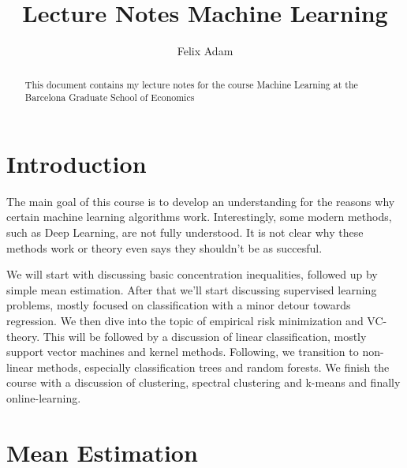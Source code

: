\documentclass[12pt, authoryear]{elsarticle}
\begin{document}
\begin{frontmatter}  %

\title{Lecture Notes Machine Learning}

\author[Add1]{Felix Adam}

\address[Add1]{Barcelona Graduate School of Economics, Barcelona, Spain}


\begin{abstract}
\small{
This document contains my lecture notes for the course Machine Learning at the Barcelona Graduate School of Economics 
}
\end{abstract}

\vspace{1cm}


\vspace{0.5cm}
\end{frontmatter}

\headsep 35pt %

\section{Introduction} \label{introduction}
The main goal of this course is to develop an understanding for the reasons why certain machine learning algorithms work. Interestingly, some modern methods, such as Deep Learning, are not fully understood. It is not clear why these methods work or theory even says they shouldn't be as succesful. 


We will start with discussing basic concentration inequalities, followed up by simple mean estimation. After that we'll start discussing supervised learning problems, mostly focused on classification with a minor detour towards regression. We then dive into the topic of empirical risk minimization and VC-theory. This will be followed by a discussion of linear classification, mostly support vector machines and kernel methods. Following, we transition to non-linear methods, especially classification trees and random forests. We finish the course with a discussion of clustering, spectral clustering and k-means and finally online-learning. 

\section{Mean Estimation} \label{mean_estimation}
\end{document}
